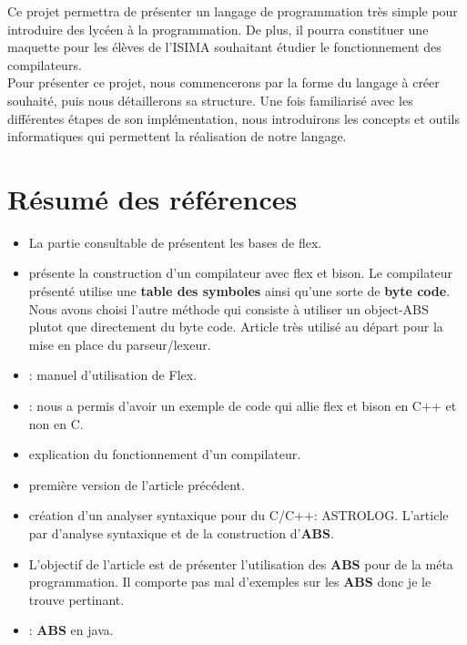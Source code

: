 \documentclass[a4paper]{article}%
\begin{document}
Ce projet permettra de présenter un langage de programmation très simple pour
introduire des lycéen à la programmation. De plus, il pourra constituer une
maquette pour les élèves de l'ISIMA souhaitant étudier le fonctionnement des
compilateurs.\\

Pour présenter ce projet, nous commencerons par la forme du langage à créer
souhaité, puis nous détaillerons sa structure. Une fois familiarisé avec les
différentes étapes de son implémentation,  nous introduirons les concepts et
outils informatiques qui permettent la réalisation de notre langage.\\

\normalsize
\clearpage{}


\section{Résumé des références}

\begin{itemize}
  \item La partie consultable de \cite{flexBisonHandbook} présentent les bases
    de flex.
  \item \cite{compilerFlexBison} présente la construction d'un compilateur avec
    flex et bison. Le compilateur présenté utilise une \textbf{table des
    symboles} ainsi qu'une sorte de \textbf{byte code}. Nous avons choisi
    l'autre méthode qui consiste à utiliser un object-ABS plutot que directement
    du byte code. Article très utilisé au départ pour la mise en place du
    parseur/lexeur.
  \item \cite{flexmanual}: manuel d'utilisation de Flex.
  \item \cite{cppparsing}: nous a permis d'avoir un exemple de code qui allie
    flex et bison en C++ et non en C.


  \item \cite{compilerTICH} explication du fonctionnement d'un compilateur.
  \item \cite{compilerTILB} première version de l'article précédent.
  \item \cite{crew1997astlog} création d'un analyser syntaxique pour du C/C++:
    ASTROLOG. L'article par d'analyse syntaxique et de la construction
    d'\textbf{ABS}.

  \item \cite{visser2002meta} L'objectif de l'article est de présenter
    l'utilisation des \textbf{ABS} pour de la méta programmation. Il comporte
    pas mal d'exemples sur les \textbf{ABS} donc je le trouve pertinant.
  \item \cite{gagnon1998sablecc}: \textbf{ABS} en java.
\end{itemize}
\end{document}
